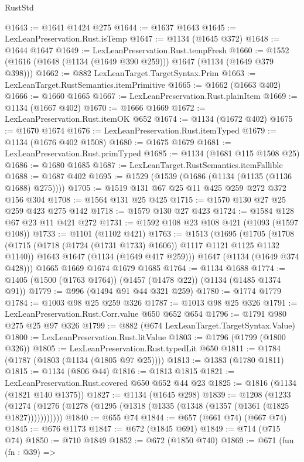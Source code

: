 \begin{lexlean}{RustStd}
\begin{coremodule}
{\begin{coremodule}
{{{{{{{@1643 := @1641 @1424 @275
@1644 := @1637 @1643
@1645 := LexLeanPreservation.Rust.isTemp
@1647 := @1134 (@1645 @372)
@1648 := @1644 @1647
@1649 := LexLeanPreservation.Rust.tempFresh
@1660 := @1552 (@1616 (@1648 (@1134 (@1649 @390 @259))) @1647 (@1134 (@1649 @379 @398)))
@1662 := @882 LexLeanTarget.TargetSyntax.Prim
@1663 := LexLeanTarget.RustSemantics.itemPrimitive
@1665 := @1662 (@1663 @402)
@1666 := @1660 @1665
@1667 := LexLeanPreservation.Rust.plainItem
@1669 := @1134 (@1667 @402)
@1670 := @1666 @1669
@1672 := LexLeanPreservation.Rust.itemOK @652
@1674 := @1134 (@1672 @402)
@1675 := @1670 @1674
@1676 := LexLeanPreservation.Rust.itemTyped
@1679 := @1134 (@1676 @402 @1508)
@1680 := @1675 @1679
@1681 := LexLeanPreservation.Rust.primTyped
@1685 := @1134 (@1681 @115 @1508 @25)
@1686 := @1680 @1685
@1687 := LexLeanTarget.RustSemantics.itemFallible
@1688 := @1687 @402
@1695 := @1529 (@1539 (@1686 (@1134 (@1135 (@1136 @1688) @275))))
@1705 := @1519 @131 @67 @25 @11 @425 @259 @272 @372 @156 @304
@1708 := @1564 @131 @25 @425
@1715 := @1570 @130 @27 @25 @259 @423 @275 @142
@1718 := @1579 @130 @27 @423
@1724 := @1584 @128 @67 @23 @11 @421 @272
@1731 := @1592 @108 @23 @108 @421 (@1093 (@1597 @108))
@1733 := @1101 (@1102 @421)
@1763 := @1513
    (@1695
      (@1705
        (@1708 (@1715 (@1718 (@1724 (@1731 @1733) @1606)) @1117 @1121 @1125 @1132 @1140))
        @1643
        @1647
        (@1134 (@1649 @417 @259)))
      @1647
      (@1134 (@1649 @374 @428)))
    @1665
    @1669
    @1674
    @1679
    @1685
@1764 := @1134 @1688
@1774 := @1405 (@1500 (@1763 @1764)) (@1457 (@1478 @22)) (@1134 (@1485 @1374 @91))
@1779 := @996 (@1494 @91 @44 @321 @259)
@1780 := @1774 @1779
@1784 := @1003 @98 @25 @259 @326
@1787 := @1013 @98 @25 @326
@1791 := LexLeanPreservation.Rust.Corr.value @650 @652 @654
@1796 := @1791 @980 @275 @25 @97 @326
@1799 := @882 (@674 LexLeanTarget.TargetSyntax.Value)
@1800 := LexLeanPreservation.Rust.litValue
@1803 := @1796 (@1799 (@1800 @326))
@1805 := LexLeanPreservation.Rust.typedLit @650
@1811 := @1784 (@1787 (@1803 (@1134 (@1805 @97 @25))))
@1813 := @1383 (@1780 @1811)
@1815 := @1134 (@806 @44)
@1816 := @1813 @1815
@1821 := LexLeanPreservation.Rust.covered @650 @652 @44 @23
@1825 := @1816 (@1134 (@1821 @140 @1375))
@1827 := @1134 (@1645 @298)
@1839 := @1208
    (@1233 (@1274 (@1276 (@1278 (@1295 (@1318 (@1335 (@1348 (@1357 (@1361 (@1825 @1827)))))))))))
@1840 := @655 @74
@1844 := @657 (@661 @74) (@667 @74)
@1845 := @676 @1173
@1847 := @672 (@1845 @691)
@1849 := @714 (@715 @74)
@1850 := @710 @1849
@1852 := @672 (@1850 @740)
@1869 := @671
    (fun (fn : @39) =>
}}}}}}}
\end{coremodule}}
\end{coremodule}
\end{lexlean}
